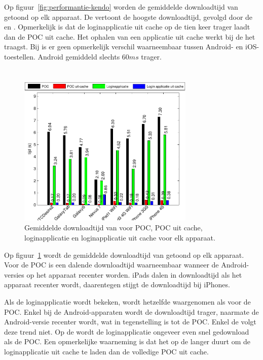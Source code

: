 Op figuur~\ref{fig:performantie-kendo} worden de gemiddelde downloadtijd van \kendo{} getoond op elk apparaat.
De \gtab{} vertoont de hoogste downloadtijd,  gevolgd door de \iphoneiii{} en \htc.
Opmerkelijk is dat de loginapplicatie uit cache op de \nexus{} tien keer trager laadt dan de POC uit cache.
Het ophalen van een applicatie uit cache werkt bij de \gs{} het traagst.
Bij \kendo{} is er geen opmerkelijk verschil waarneembaar tussen Android- en iOS-toestellen.
Android gemiddeld slechts $60\unit{ms}$ trager.


\section*{\jqm}
\label{app:performantie-jqm}

\begin{figure}
  \centering
  \includegraphics[width=0.75\textwidth]{figuren/performance-jquery.pdf}
  \caption{Gemiddelde downloadtijd van \jqm{} voor POC,  POC uit cache, loginapplicatie en loginapplicatie uit cache voor elk apparaat.}
  \label{fig:performantie-jqm}
\end{figure}

Op figuur~\ref{fig:performantie-jqm} wordt de gemiddelde downloadtijd van \jqm{} getoond op elk apparaat.
Voor de POC is een dalende downloadtijd waarneembaar wanneer de Android-versies op het apparaat recenter worden.
iPads dalen in downloadtijd als het apparaat recenter wordt, daarentegen stijgt de downloadtijd bij iPhones.

Als de loginapplicatie wordt bekeken, wordt hetzelfde waargenomen als voor de POC.
Enkel bij de Android-apparaten wordt de downloadtijd trager, naarmate de Android-versie recenter wordt, wat in tegenstelling is tot de POC.
Enkel de \nexus{} volgt deze trend niet.
Op de \nexus{} wordt de loginapplicatie ongeveer even snel gedownload als de POC.
Een opmerkelijke waarneming is dat het op de \nexus{} langer duurt om de loginapplicatie uit cache te laden dan de volledige POC uit cache.

